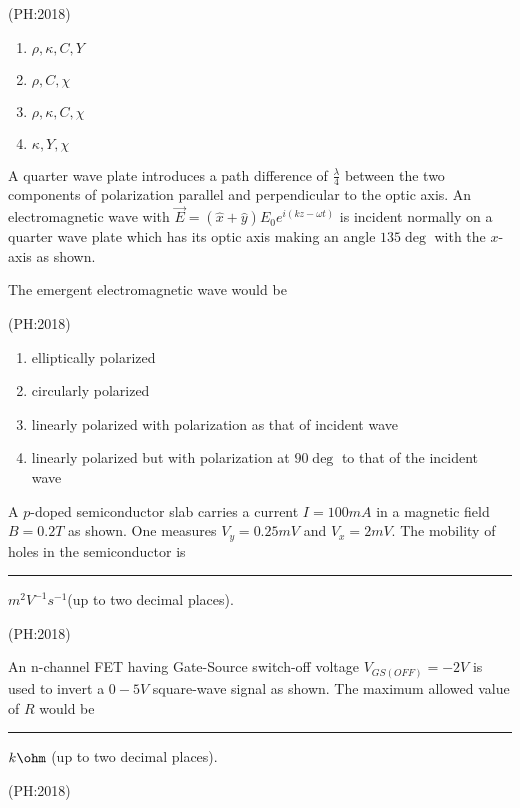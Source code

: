     \hfill{(PH:2018)}
    \begin{multicols}{4}
    \begin{enumerate}
        \item $\rho, \kappa, C, Y$
        \item $\rho, C, \chi$
        \item $\rho, \kappa, C, \chi$
        \item $\kappa, Y, \chi$
    \end{enumerate}
	    \end{multicols}
  
  \item	  A quarter wave plate introduces a path difference of $\frac{\lambda}{4}$ between the two components of polarization parallel and perpendicular to the optic axis. An electromagnetic wave with $\overrightarrow{E} = (\hat{x} + \hat{y}) E_0 e^{i(kz - \omega t)} $ is incident normally on a quarter wave plate which has its optic axis making an angle $135\deg$ with the $x$-axis as shown.\\
	  \begin{center}
		  
	  \end{center}
	  The emergent electromagnetic wave would be

	  \hfill{(PH:2018)}
	  \begin{enumerate}
		  \item elliptically polarized
		  \item circularly polarized
		  \item linearly polarized with polarization as that of incident wave
		  \item linearly polarized but with polarization at $90\deg$ to that of the incident wave
	  \end{enumerate}
  \item
	  A $p$-doped semiconductor slab carries a current $I=100mA$ in a magnetic field $B=0.2T$ as shown. One measures $V_y =0.25mV$ and $V_x =2mV$. The mobility of holes in the semiconductor is \rule{2cm}{0.4pt}$m^2 V^{-1} s^{-1}$(up to two decimal places).

	  \hfill{(PH:2018)}
	  \begin{center}
		  
	  \end{center}

  \item
	  An n-channel FET having Gate-Source switch-off voltage $V_{GS(OFF)}=-2V$ is used to invert a $0-5V$ square-wave signal as shown. The maximum allowed value of $R$ would be \rule{2cm}{0.4pt}$k\ohm$ (up to two decimal places).

	  \hfill{(PH:2018)}
 \begin{center}
		  
	  \end{center}


